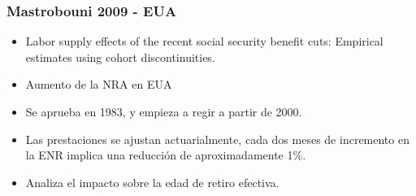 \documentclass{beamer}
\begin{document}
              \frame
              {
                \frametitle{Mastrobouni 2009 - EUA}
                  \begin{itemize}
                  \item Labor supply effects of the recent social security benefit cuts: Empirical estimates using cohort discontinuities.
                  \item Aumento de la NRA en EUA
                  \item Se aprueba en 1983, y empieza a regir a partir de 2000.
                  \item Las prestaciones se ajustan actuarialmente, cada dos meses de incremento en la ENR implica una reducción de aproximadamente 1\%.
                  \item Analiza el impacto sobre la edad de retiro efectiva.
                  \end{itemize}
}
\end{document}

